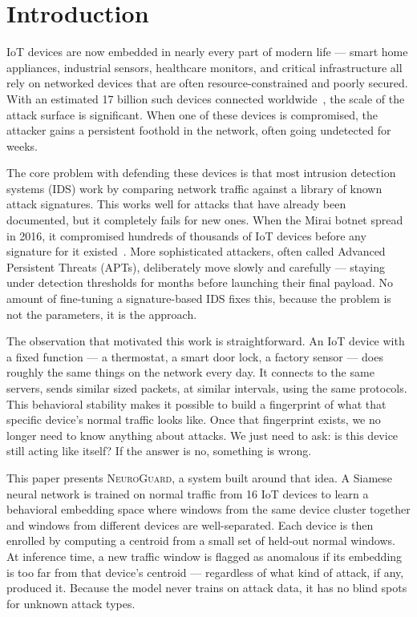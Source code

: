\documentclass[journal,10pt,twoside]{IEEEtran}
\newcommand{\neuroguard}{\textsc{NeuroGuard}}
\begin{document}
\section{Introduction}
\label{sec:intro}

IoT devices are now embedded in nearly every part of modern life --- smart
home appliances, industrial sensors, healthcare monitors, and critical
infrastructure all rely on networked devices that are often resource-constrained
and poorly secured.
With an estimated 17 billion such devices connected worldwide~\cite{statista2023iot},
the scale of the attack surface is significant.
When one of these devices is compromised, the attacker gains a persistent
foothold in the network, often going undetected for weeks.

The core problem with defending these devices is that most intrusion detection
systems (IDS) work by comparing network traffic against a library of known
attack signatures.
This works well for attacks that have already been documented, but it completely
fails for new ones.
When the Mirai botnet spread in 2016, it compromised hundreds of thousands of
IoT devices before any signature for it
existed~\cite{antonakakis2017mirai}.
More sophisticated attackers, often called Advanced Persistent Threats (APTs),
deliberately move slowly and carefully --- staying under detection thresholds
for months before launching their final payload.
No amount of fine-tuning a signature-based IDS fixes this, because the problem
is not the parameters, it is the approach.

The observation that motivated this work is straightforward.
An IoT device with a fixed function --- a thermostat, a smart door lock, a
factory sensor --- does roughly the same things on the network every day.
It connects to the same servers, sends similar sized packets, at similar
intervals, using the same protocols.
This behavioral stability makes it possible to build a fingerprint of what that
specific device's normal traffic looks like.
Once that fingerprint exists, we no longer need to know anything about attacks.
We just need to ask: is this device still acting like itself?
If the answer is no, something is wrong.

This paper presents \neuroguard{}, a system built around that idea.
A Siamese neural network is trained on normal traffic from 16 IoT devices to
learn a behavioral embedding space where windows from the same device cluster
together and windows from different devices are well-separated.
Each device is then enrolled by computing a centroid from a small set of
held-out normal windows.
At inference time, a new traffic window is flagged as anomalous if its
embedding is too far from that device's centroid --- regardless of what kind
of attack, if any, produced it.
Because the model never trains on attack data, it has no blind spots for
unknown attack types.
\end{document}
